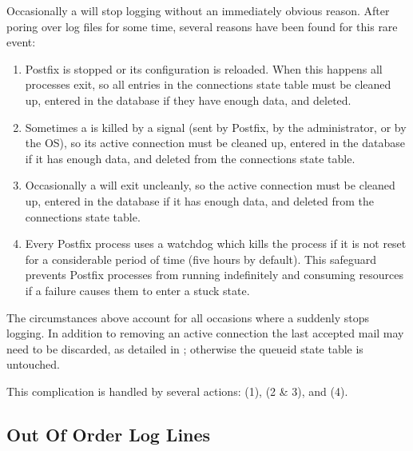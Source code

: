 \label{smtpd stops logging}

Occasionally a  will stop logging without an immediately
obvious reason.  After poring over log files for some time, several reasons
have been found for this rare event:

\begin{enumerate}

    \item Postfix is stopped or its configuration is reloaded.  When this
        happens all  processes exit, so all entries in the
        connections state table must be cleaned up, entered in the database
        if they have enough data, and deleted.

    \item Sometimes a  is killed by a signal (sent by
        Postfix, by the administrator, or by the OS), so its active
        connection must be cleaned up, entered in the database if it has
        enough data, and deleted from the connections state table.

    \item Occasionally a  will exit uncleanly, so the active
        connection must be cleaned up, entered in the database if it has
        enough data, and deleted from the connections state table.

    \item Every Postfix process uses a watchdog which kills the process if
        it is not reset for a considerable period of time (five hours by
        default).  This safeguard prevents Postfix processes from running
        indefinitely and consuming resources if a failure causes them to
        enter a stuck state.

\end{enumerate}

The circumstances above account for all occasions where a 
suddenly stops logging.  In addition to removing an active connection the
last accepted mail may need to be discarded, as detailed in
; otherwise the queueid state table
is untouched.

This complication is handled by several actions:  (1),
 (2 \& 3), and  (4).


\subsection{Out Of Order Log Lines}

